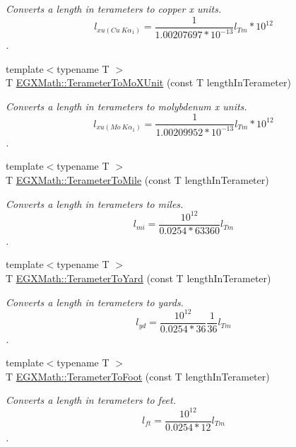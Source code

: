 \begin{DoxyCompactItemize}
\begin{DoxyCompactList}\small\item\em Converts a length in terameters to copper x units. \[ l_{xu(Cu\ K\alpha_1)}= \frac{1}{1.00207697*10^{-13}} l_{Tm} * 10^{12}\]. \end{DoxyCompactList}\item 
{\footnotesize template$<$typename T $>$ }\\T \mbox{\hyperlink{group___e_g_x_math-_conversions-_length_conversions-_s_i-_terameter-_non-_s_i_ga391bcf9b529c2e20f2773c699bb0197a}{E\+G\+X\+Math\+::\+Terameter\+To\+Mo\+X\+Unit}} (const T length\+In\+Terameter)
\begin{DoxyCompactList}\small\item\em Converts a length in terameters to molybdenum x units. \[ l_{xu(Mo\ K\alpha_1)}=\frac{1}{1.00209952*10^{-13}} l_{Tm} * 10^{12}\]. \end{DoxyCompactList}\item 
{\footnotesize template$<$typename T $>$ }\\T \mbox{\hyperlink{group___e_g_x_math-_conversions-_length_conversions-_s_i-_terameter-_imperial_ga51468f3ffd5925fb2cbb188d49b6aa60}{E\+G\+X\+Math\+::\+Terameter\+To\+Mile}} (const T length\+In\+Terameter)
\begin{DoxyCompactList}\small\item\em Converts a length in terameters to miles. \[ l_{mi}=\frac{10^{12}}{0.0254 * 63360} l_{Tm} \]. \end{DoxyCompactList}\item 
{\footnotesize template$<$typename T $>$ }\\T \mbox{\hyperlink{group___e_g_x_math-_conversions-_length_conversions-_s_i-_terameter-_imperial_ga4f3bcac82e02fddb21fedf80ec01275b}{E\+G\+X\+Math\+::\+Terameter\+To\+Yard}} (const T length\+In\+Terameter)
\begin{DoxyCompactList}\small\item\em Converts a length in terameters to yards. \[ l_{yd}= \frac{10^{12}}{0.0254 * 36} \frac{1}{36} l_{Tm} \]. \end{DoxyCompactList}\item 
{\footnotesize template$<$typename T $>$ }\\T \mbox{\hyperlink{group___e_g_x_math-_conversions-_length_conversions-_s_i-_terameter-_imperial_gaf903b744223a3acb964367da6f14b96f}{E\+G\+X\+Math\+::\+Terameter\+To\+Foot}} (const T length\+In\+Terameter)
\begin{DoxyCompactList}\small\item\em Converts a length in terameters to feet. \[ l_{ft}= \frac{10^{12}}{0.0254 * 12} l_{Tm} \]. \end{DoxyCompactList}\item 

\end{DoxyCompactItemize}

